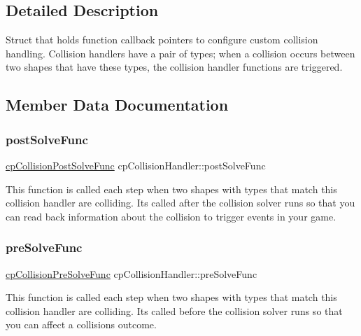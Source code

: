 \subsection{Detailed Description}
Struct that holds function callback pointers to configure custom collision handling. Collision handlers have a pair of types; when a collision occurs between two shapes that have these types, the collision handler functions are triggered. 

\subsection{Member Data Documentation}
\mbox{\label{structcpCollisionHandler_adc3df1896d48519cc5359c51bd67ac98}} 
\subsubsection{\texorpdfstring{post\+Solve\+Func}{postSolveFunc}}
{\footnotesize\ttfamily \hyperlink{group__cpSpace_gaccb60bbb090c97823f49ee49e4e5d3c3}{cp\+Collision\+Post\+Solve\+Func} cp\+Collision\+Handler\+::post\+Solve\+Func}

This function is called each step when two shapes with types that match this collision handler are colliding. It\textquotesingle{}s called after the collision solver runs so that you can read back information about the collision to trigger events in your game. \mbox{\label{structcpCollisionHandler_aff35bdeedae80600cbbb1a68682a7431}} 
\subsubsection{\texorpdfstring{pre\+Solve\+Func}{preSolveFunc}}
{\footnotesize\ttfamily \hyperlink{group__cpSpace_ga89b24d53d81a5a028198c3c2d3c39a9d}{cp\+Collision\+Pre\+Solve\+Func} cp\+Collision\+Handler\+::pre\+Solve\+Func}

This function is called each step when two shapes with types that match this collision handler are colliding. It\textquotesingle{}s called before the collision solver runs so that you can affect a collision\textquotesingle{}s outcome. \mbox{\label{structcpCollisionHandler_a07bbc9d26af9d41cc87bae6514930d9f}} 
